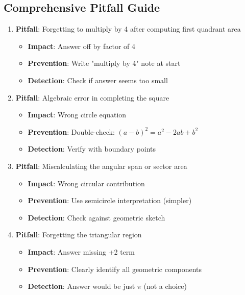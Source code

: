 \documentclass[]{article}
\begin{document}
\begin{solutionbox}
\subsection*{Comprehensive Pitfall Guide}
\begin{enumerate}[leftmargin=*]
    \item \textbf{Pitfall}: Forgetting to multiply by 4 after computing first quadrant area
    \begin{itemize}
        \item \textbf{Impact}: Answer off by factor of 4
        \item \textbf{Prevention}: Write "multiply by 4" note at start
        \item \textbf{Detection}: Check if answer seems too small
    \end{itemize}
    
    \item \textbf{Pitfall}: Algebraic error in completing the square
    \begin{itemize}
        \item \textbf{Impact}: Wrong circle equation
        \item \textbf{Prevention}: Double-check: $(a-b)^2 = a^2 - 2ab + b^2$
        \item \textbf{Detection}: Verify with boundary points
    \end{itemize}
    
    \item \textbf{Pitfall}: Miscalculating the angular span or sector area
    \begin{itemize}
        \item \textbf{Impact}: Wrong circular contribution
        \item \textbf{Prevention}: Use semicircle interpretation (simpler)
        \item \textbf{Detection}: Check against geometric sketch
    \end{itemize}
    
    \item \textbf{Pitfall}: Forgetting the triangular region
    \begin{itemize}
        \item \textbf{Impact}: Answer missing +2 term
        \item \textbf{Prevention}: Clearly identify all geometric components
        \item \textbf{Detection}: Answer would be just $\pi$ (not a choice)
    \end{itemize}
    

\end{enumerate}
\end{solutionbox}
\end{document}
